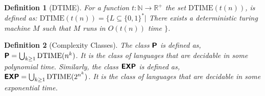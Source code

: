 \documentclass[a4paper]{exam}
\newcommand{\classX}[1]{\ensuremath{\text{\textsf{\textbf{#1}}}}}
\newcommand{\classP}{\classX{P}}
\newcommand{\EXP}{\classX{EXP}}
\newcommand{\Dtime}{\text{DTIME}}
\newtheorem{definition}{Definition}
\begin{document}
\begin{questions}
      \begin{definition}[DTIME]
        For a function $t: \mathbb{N} \to \mathbb{R}^+$ the set $\Dtime(t(n))$, is defined as: 
        $\Dtime(t(n)) = \{L \subseteq \{0,1\}^*|$ There exists a deterministic turing machine $M$ such that $M$ runs in $O(t(n))$ time $\}$.
      \end{definition}
   
      \begin{definition}[Complexity Classes]
        The class $\classP$ is defined as, $\classP = \bigcup_{k \geq 1} \Dtime(n^k)$. It is the class of languages that are decidable in some polynomial time.
        Similarly, the class $\EXP$ is defined as, $\EXP = \bigcup_{k \geq 1} \Dtime(2^{n^k})$. It is the class of languages that are decidable in some exponential time.
      \end{definition} 
  
\end{questions}
\end{document}
